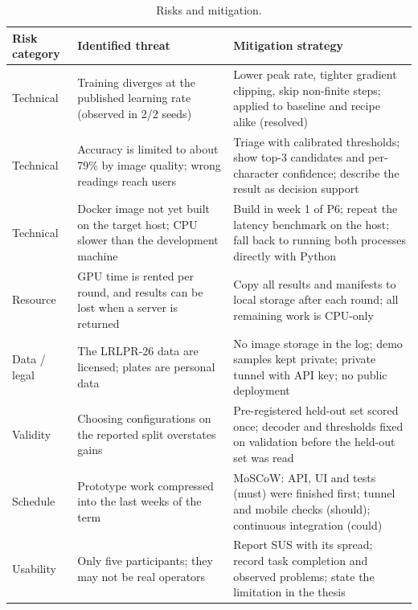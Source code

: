 \documentclass[11pt,a4paper]{article}
\begin{document}
\begin{table}[H]
\centering\small
\caption{Risks and mitigation.}\label{tab:risks}
\begin{tabularx}{\textwidth}{@{}P{2.2cm}LL@{}}
\toprule
Risk category & Identified threat & Mitigation strategy \\
\midrule
Technical & Training diverges at the published learning rate (observed in 2/2 seeds) & Lower peak rate, tighter gradient clipping, skip non-finite steps; applied to baseline and recipe alike (resolved) \\
Technical & Accuracy is limited to about 79\% by image quality; wrong readings reach users & Triage with calibrated thresholds; show top-3 candidates and per-character confidence; describe the result as decision support \\
Technical & Docker image not yet built on the target host; CPU slower than the development machine & Build in week 1 of P6; repeat the latency benchmark on the host; fall back to running both processes directly with Python \\
Resource & GPU time is rented per round, and results can be lost when a server is returned & Copy all results and manifests to local storage after each round; all remaining work is CPU-only \\
Data / legal & The LRLPR-26 data are licensed; plates are personal data & No image storage in the log; demo samples kept private; private tunnel with API key; no public deployment \\
Validity & Choosing configurations on the reported split overstates gains & Pre-registered held-out set scored once; decoder and thresholds fixed on validation before the held-out set was read \\
Schedule & Prototype work compressed into the last weeks of the term & MoSCoW: API, UI and tests (must) were finished first; tunnel and mobile checks (should); continuous integration (could) \\
Usability & Only five participants; they may not be real operators & Report SUS with its spread; record task completion and observed problems; state the limitation in the thesis \\
\bottomrule
\end{tabularx}
\end{table}

\renewcommand{\refname}{6.\quad REFERENCES}

\end{document}

